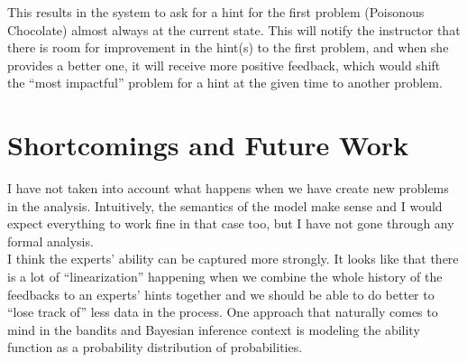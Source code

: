 \documentclass[conference]{IEEEtran}
\begin{document}
	
	This results in the system to ask for a hint for the first problem (Poisonous Chocolate) almost always at the current state. This will notify the instructor that there is room for improvement in the hint(s) to the first problem, and when she provides a better one, it will receive more positive feedback, which would shift the ``most impactful'' problem for a hint at the given time to another problem.
	
	
	\section{Shortcomings and Future Work}
	I have not taken into account what happens when we have create new problems in the analysis. Intuitively, the semantics of the model
	make sense and I would expect everything to work fine in that case too, but I have not gone through any formal analysis.\\
	I think the experts' ability can be captured more strongly. It looks like that there is a lot of ``linearization'' happening when
	we combine the whole history of the feedbacks to an experts' hints together and we should be able to do better to ``lose track of''
	less data in the process. One approach that naturally comes to mind in the bandits and Bayesian inference context is modeling the
	ability function as a probability distribution of probabilities.

	
%	
	
%	
%	
	
\end{document}
